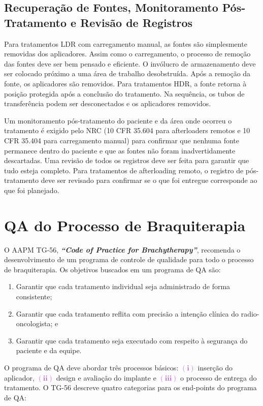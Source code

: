 \documentclass[11pt,a4paper]{article}
\begin{document}
\subsection*{Recuperação de Fontes, Monitoramento Pós-Tratamento e Revisão de Registros}

	Para tratamentos LDR com carregamento manual, as fontes são simplesmente removidas dos aplicadores. Assim como o carregamento, o processo de remoção das fontes deve ser bem pensado e eficiente. O invólucro de armazenamento deve ser colocado próximo a uma área de trabalho desobstruída. Após a remoção da fonte, os aplicadores são removidos. Para tratamentos HDR, a fonte retorna à posição protegida após a conclusão do tratamento. Na sequência, os tubos de transferência podem ser desconectados e os aplicadores removidos.

	Um monitoramento pós-tratamento do paciente e da área onde ocorreu o tratamento é exigido pelo NRC (10 CFR 35.604 para afterloaders remotos e 10 CFR 35.404 para carregamento manual) para confirmar que nenhuma fonte permanece dentro do paciente e que as fontes não foram inadvertidamente descartadas. Uma revisão de todos os registros deve ser feita para garantir que tudo esteja completo. Para tratamentos de afterloading remoto, o registro de pós-tratamento deve ser revisado para confirmar se o que foi entregue corresponde ao que foi planejado.

\section{QA do Processo de Braquiterapia}

	O AAPM TG-56, \textit{\textbf{``Code of Practice for Brachytherapy''}}, recomenda o desenvolvimento de um programa de controle de qualidade para todo o processo de braquiterapia. Os objetivos buscados em um programa de QA são:

	\begin{enumerate}
		\item Garantir que cada tratamento individual seja administrado de forma consistente;
		\item Garantir que cada tratamento reflita com precisão a intenção clínica do radio-oncologista; e
		\item Garantir que cada tratamento seja executado com respeito à segurança do paciente e da equipe.
	\end{enumerate}

	O programa de QA deve abordar três processos básicos: \textcolor{MediumOrchid}{$\mathbf{(i)}$} inserção do aplicador, \textcolor{MediumOrchid}{$\mathbf{(ii)}$} design e avaliação do implante e \textcolor{MediumOrchid}{$\mathbf{(iii)}$} o processo de entrega do tratamento. O TG-56 descreve quatro categorias para os end-points do programa de QA:
\end{document}
